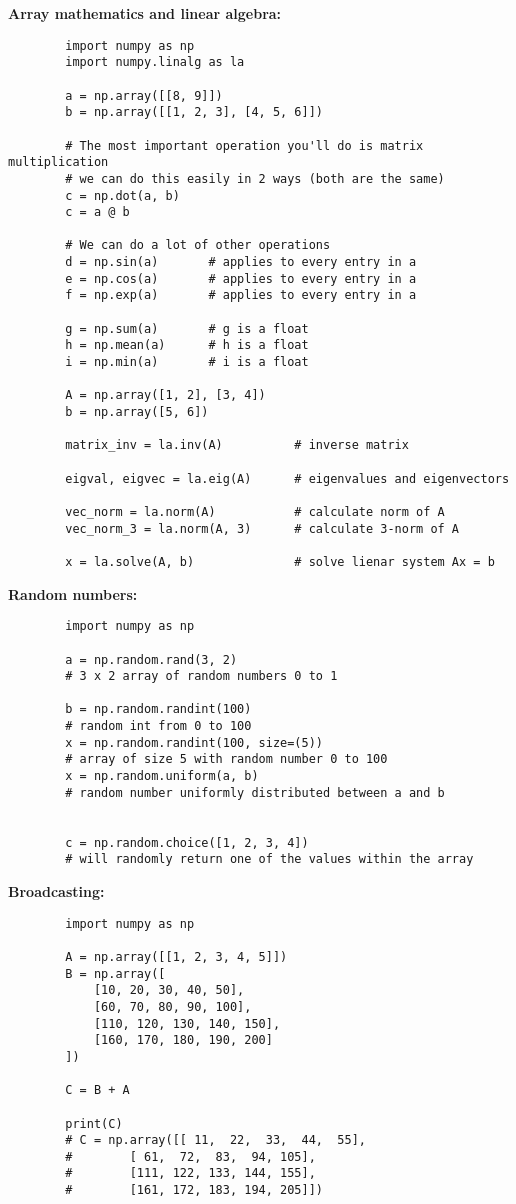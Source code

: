 \documentclass[12pt]{article}
\begin{document}
\medskip
\noindent \textbf{Array mathematics and linear algebra:}
    \begin{verbatim}
        import numpy as np
        import numpy.linalg as la
        
        a = np.array([[8, 9]])
        b = np.array([[1, 2, 3], [4, 5, 6]]) 
        
        # The most important operation you'll do is matrix multiplication
        # we can do this easily in 2 ways (both are the same)
        c = np.dot(a, b)
        c = a @ b
        
        # We can do a lot of other operations 
        d = np.sin(a)       # applies to every entry in a
        e = np.cos(a)       # applies to every entry in a
        f = np.exp(a)       # applies to every entry in a
        
        g = np.sum(a)       # g is a float
        h = np.mean(a)      # h is a float
        i = np.min(a)       # i is a float

        A = np.array([1, 2], [3, 4])
        b = np.array([5, 6])
        
        matrix_inv = la.inv(A)          # inverse matrix
        
        eigval, eigvec = la.eig(A)      # eigenvalues and eigenvectors
        
        vec_norm = la.norm(A)           # calculate norm of A
        vec_norm_3 = la.norm(A, 3)      # calculate 3-norm of A
        
        x = la.solve(A, b)              # solve lienar system Ax = b
    \end{verbatim}

\newpage
\noindent \textbf{Random numbers:}
    \begin{verbatim}
        import numpy as np
    
        a = np.random.rand(3, 2)
        # 3 x 2 array of random numbers 0 to 1
        
        b = np.random.randint(100)
        # random int from 0 to 100
        x = np.random.randint(100, size=(5))
        # array of size 5 with random number 0 to 100
        x = np.random.uniform(a, b)
        # random number uniformly distributed between a and b
        
    
        c = np.random.choice([1, 2, 3, 4])
        # will randomly return one of the values within the array
    \end{verbatim}

\medskip
\noindent \textbf{Broadcasting:}
    \begin{verbatim}
        import numpy as np
        
        A = np.array([[1, 2, 3, 4, 5]])
        B = np.array([
            [10, 20, 30, 40, 50],
            [60, 70, 80, 90, 100],
            [110, 120, 130, 140, 150],
            [160, 170, 180, 190, 200]
        ])
        
        C = B + A
        
        print(C)
        # C = np.array([[ 11,  22,  33,  44,  55],
        #        [ 61,  72,  83,  94, 105],
        #        [111, 122, 133, 144, 155],
        #        [161, 172, 183, 194, 205]])
    \end{verbatim}
\end{document}
